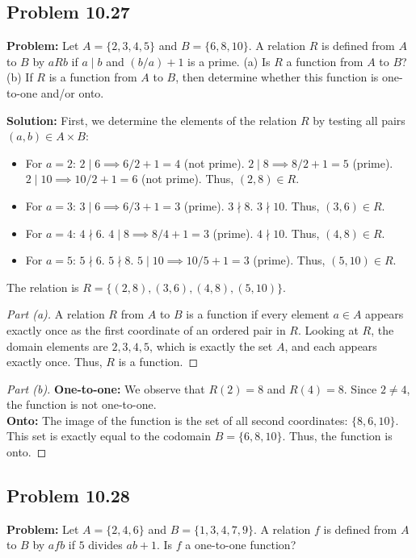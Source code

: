 \documentclass[11pt, a4paper]{article}
\theoremstyle{definition}
\theoremstyle{remark}
\begin{document}
\subsection{Problem 10.27}
\textbf{Problem:} Let $A = \{2, 3, 4, 5\}$ and $B = \{6, 8, 10\}$. A relation $R$ is defined from $A$ to $B$ by $a R b$ if $a \mid b$ and $(b/a) + 1$ is a prime. (a) Is $R$ a function from $A$ to $B$? (b) If $R$ is a function from $A$ to $B$, then determine whether this function is one-to-one and/or onto.

\textbf{Solution:}
First, we determine the elements of the relation $R$ by testing all pairs $(a, b) \in A \times B$:
\begin{itemize}
    \item For $a = 2$: $2 \mid 6 \implies 6/2 + 1 = 4$ (not prime). $2 \mid 8 \implies 8/2 + 1 = 5$ (prime). $2 \mid 10 \implies 10/2 + 1 = 6$ (not prime). Thus, $(2, 8) \in R$.
    \item For $a = 3$: $3 \mid 6 \implies 6/3 + 1 = 3$ (prime). $3 \nmid 8$. $3 \nmid 10$. Thus, $(3, 6) \in R$.
    \item For $a = 4$: $4 \nmid 6$. $4 \mid 8 \implies 8/4 + 1 = 3$ (prime). $4 \nmid 10$. Thus, $(4, 8) \in R$.
    \item For $a = 5$: $5 \nmid 6$. $5 \nmid 8$. $5 \mid 10 \implies 10/5 + 1 = 3$ (prime). Thus, $(5, 10) \in R$.
\end{itemize}
The relation is $R = \{(2, 8), (3, 6), (4, 8), (5, 10)\}$.

\begin{proof}[Part (a)]
A relation $R$ from $A$ to $B$ is a function if every element $a \in A$ appears exactly once as the first coordinate of an ordered pair in $R$. Looking at $R$, the domain elements are $2, 3, 4, 5$, which is exactly the set $A$, and each appears exactly once. Thus, $R$ is a function.
\end{proof}
\begin{proof}[Part (b)]
\textbf{One-to-one:} We observe that $R(2) = 8$ and $R(4) = 8$. Since $2 \neq 4$, the function is not one-to-one. \\
\textbf{Onto:} The image of the function is the set of all second coordinates: $\{8, 6, 10\}$. This set is exactly equal to the codomain $B = \{6, 8, 10\}$. Thus, the function is onto.
\end{proof}

\subsection{Problem 10.28}
\textbf{Problem:} Let $A = \{2, 4, 6\}$ and $B = \{1, 3, 4, 7, 9\}$. A relation $f$ is defined from $A$ to $B$ by $a f b$ if $5$ divides $ab + 1$. Is $f$ a one-to-one function?
\end{document}
